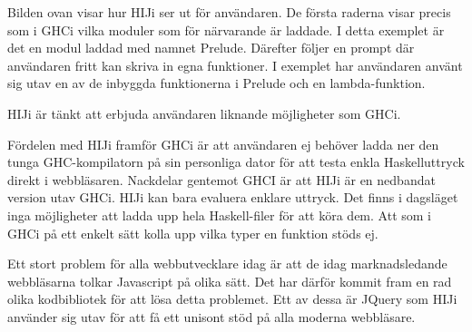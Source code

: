 Bilden ovan visar hur HIJi ser ut för användaren. De första raderna visar precis som i GHCi vilka moduler som för närvarande är laddade. I detta exemplet är det en modul laddad med namnet Prelude. Därefter följer en prompt där användaren fritt kan skriva in egna funktioner. I exemplet har användaren använt sig utav en av de inbyggda funktionerna i Prelude och en lambda-funktion.


HIJi är tänkt att erbjuda användaren liknande möjligheter som GHCi. 

Fördelen med HIJi framför GHCi är att användaren ej behöver ladda ner den tunga GHC-kompilatorn på sin personliga dator för att testa enkla Haskelluttryck direkt i webbläsaren.
Nackdelar gentemot GHCI är att HIJi är en nedbandat version utav GHCi. HIJi kan bara evaluera enklare uttryck. Det finns i dagsläget inga möjligheter att ladda upp hela Haskell-filer för att köra dem. Att som i GHCi på ett enkelt sätt kolla upp vilka typer en funktion stöds ej.

Ett stort problem för alla webbutvecklare idag är att de idag marknadsledande webbläsarna tolkar Javascript på olika sätt. Det har därför kommit fram en rad olika kodbibliotek för att lösa detta problemet. Ett av dessa är JQuery som HIJi använder sig utav för att få ett unisont stöd på alla moderna webbläsare. 


